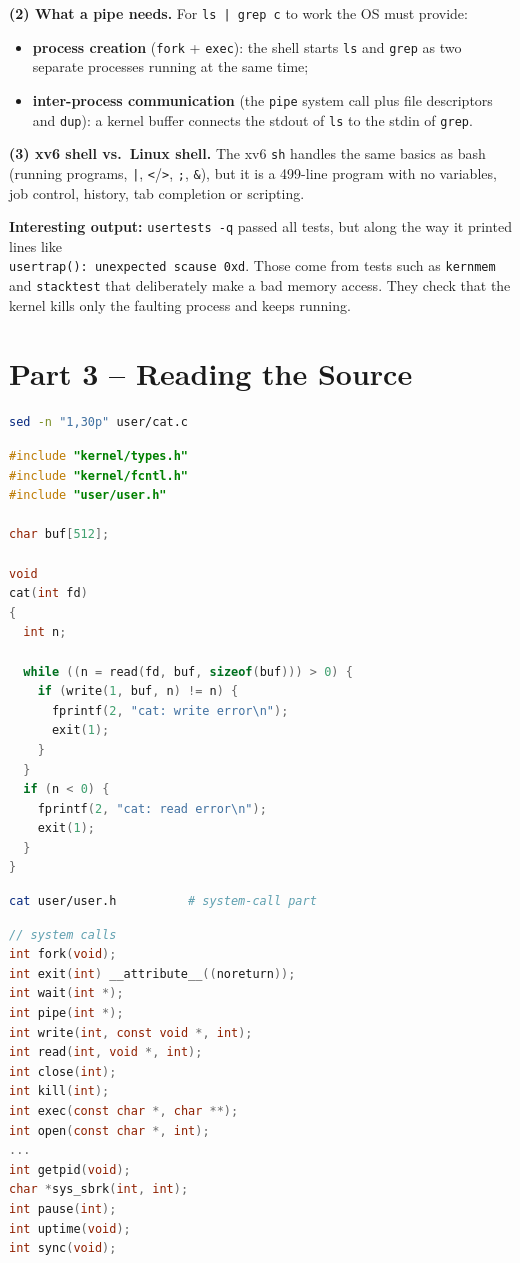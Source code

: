 \documentclass[12pt]{article}
\begin{document}
\textbf{(2) What a pipe needs.} For \texttt{ls | grep c} to work the OS must provide:
\begin{itemize}
    \item \textbf{process creation} (\texttt{fork} + \texttt{exec}): the shell starts \texttt{ls} and \texttt{grep} as two separate processes running at the same time;
    \item \textbf{inter-process communication} (the \texttt{pipe} system call plus file descriptors and \texttt{dup}): a kernel buffer connects the stdout of \texttt{ls} to the stdin of \texttt{grep}.
\end{itemize}

\textbf{(3) xv6 shell vs.\ Linux shell.} The xv6 \texttt{sh} handles the same basics as bash (running programs, \texttt{|}, \texttt{<}/\texttt{>}, \texttt{;}, \texttt{\&}), but it is a 499-line program with no variables, job control, history, tab completion or scripting.

\textbf{Interesting output:} \texttt{usertests -q} passed all tests, but along the way it printed lines like \\\texttt{usertrap(): unexpected scause 0xd}. Those come from tests such as \texttt{kernmem} and \texttt{stacktest} that deliberately make a bad memory access. They check that the kernel kills only the faulting process and keeps running.

\section*{Part 3 -- Reading the Source}
\begin{lstlisting}[language=bash]
sed -n "1,30p" user/cat.c
\end{lstlisting}
\begin{lstlisting}[language=C]
#include "kernel/types.h"
#include "kernel/fcntl.h"
#include "user/user.h"

char buf[512];

void
cat(int fd)
{
  int n;

  while ((n = read(fd, buf, sizeof(buf))) > 0) {
    if (write(1, buf, n) != n) {
      fprintf(2, "cat: write error\n");
      exit(1);
    }
  }
  if (n < 0) {
    fprintf(2, "cat: read error\n");
    exit(1);
  }
}
\end{lstlisting}

\begin{lstlisting}[language=bash]
cat user/user.h          # system-call part
\end{lstlisting}
\begin{lstlisting}[language=C]
// system calls
int fork(void);
int exit(int) __attribute__((noreturn));
int wait(int *);
int pipe(int *);
int write(int, const void *, int);
int read(int, void *, int);
int close(int);
int kill(int);
int exec(const char *, char **);
int open(const char *, int);
...
int getpid(void);
char *sys_sbrk(int, int);
int pause(int);
int uptime(void);
int sync(void);
\end{lstlisting}
\end{document}
